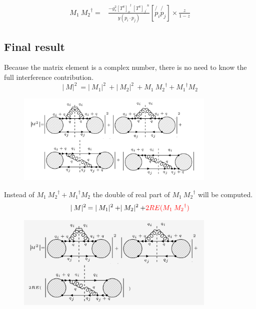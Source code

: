 \begin{equation}
\begin{split}
M_1\: {M_2}^{\dagger} =& \frac{-g_s^2 {[T^a]_o}^l \:{[T^a]_{f^{\prime}}}^n }{y(p_i \cdot p_j)} [\not{p_i}\not{p_j}]\times\frac{z}{1-z}
\end{split}
\end{equation}









\pagebreak

\subsection{Final result}
\label{fin}
Because the matrix element is a complex number, there is no need to know the full interference contribution.
\begin{equation}
\lvert\:M\lvert^2\: = \lvert\:M_1\lvert^2\:+\lvert\:M_2\lvert^2\:+ M_1\: {M_2}^{\dagger} +{M_1}^{\dagger} M_2
\end{equation}
\begin{figure}[h!]
\centering
\includegraphics[width=0.85\textwidth]{images/QQ/qqgMSquer.png}
\end{figure}
Instead of $ M_1\: {M_2}^{\dagger} +{M_1}^{\dagger} M_2 $ the double of real part of $M_1\: {M_2}^{\dagger}$ will be computed.
\begin{equation}
\lvert\:M\lvert^2\: = \lvert\:M_1\lvert^2\:+\lvert\:M_2\lvert^2\:+ {\color[RGB]{255,0,0} 2RE(M_1\: {M_2}^{\dagger})}
\end{equation}
\begin{figure}[h!]
\centering
\includegraphics[width=0.85\textwidth]{images/QQ/REqqgMSquer.png}
\end{figure}
